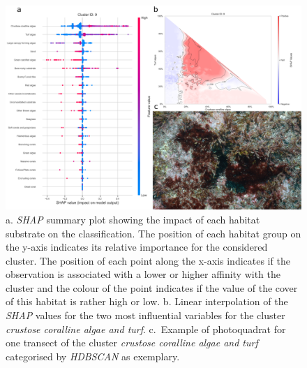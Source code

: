 \begin{figure}
\hypertarget{fig:chap2figS29}{%
\centering
\includegraphics{03-Chapitre2/figures/supplementary/05-explanation_shap_pq_cluster_9.png}
\caption{a. \emph{SHAP} summary plot showing the impact of each habitat
substrate on the classification. The position of each habitat group on
the y-axis indicates its relative importance for the considered cluster.
The position of each point along the x-axis indicates if the observation
is associated with a lower or higher affinity with the cluster and the
colour of the point indicates if the value of the cover of this habitat
is rather high or low. b. Linear interpolation of the \emph{SHAP} values
for the two most influential variables for the cluster \emph{crustose
coralline algae and turf}. c.~Example of photoquadrat for one transect
of the cluster \emph{crustose coralline algae and turf} categorised by
\emph{HDBSCAN} as exemplary.}\label{fig:chap2figS29}
}
\end{figure}

